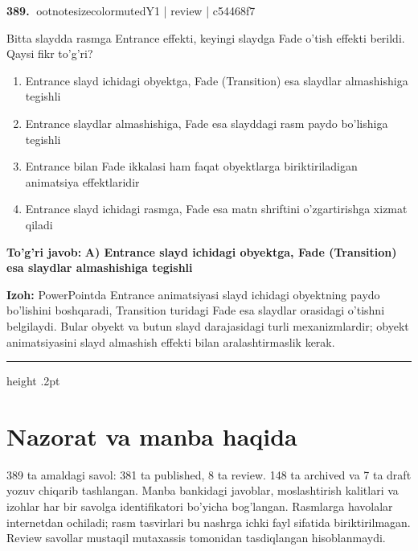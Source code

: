 \documentclass[10pt,a4paper]{article}
\begin{document}
\textbf{\color{ink}389.} {ootnotesizecolor{muted}Y1 | review | c54468f7}
\par
Bitta slaydda rasmga Entrance effekti, keyingi slaydga Fade o'tish effekti berildi. Qaysi fikr to'g'ri?
\begin{enumerate}[label=\Alph*),leftmargin=9mm]
\item Entrance slayd ichidagi obyektga, Fade (Transition) esa slaydlar almashishiga tegishli
\item Entrance slaydlar almashishiga, Fade esa slayddagi rasm paydo bo'lishiga tegishli
\item Entrance bilan Fade ikkalasi ham faqat obyektlarga biriktiriladigan animatsiya effektlaridir
\item Entrance slayd ichidagi rasmga, Fade esa matn shriftini o'zgartirishga xizmat qiladi
\end{enumerate}
\begin{tcolorbox}[enhanced,breakable,colback=teal!4,colframe=teal!55!black,boxrule=0.45pt,arc=1.2mm,left=2.8mm,right=2.8mm,top=2mm,bottom=2mm]
\textbf{\color{teal}To'g'ri javob:} \textbf{A) Entrance slayd ichidagi obyektga, Fade (Transition) esa slaydlar almashishiga tegishli}
\par\smallskip
\textbf{Izoh:} PowerPointda Entrance animatsiyasi slayd ichidagi obyektning paydo bo'lishini boshqaradi, Transition turidagi Fade esa slaydlar orasidagi o'tishni belgilaydi. Bular obyekt va butun slayd darajasidagi turli mexanizmlardir; obyekt animatsiyasini slayd almashish effekti bilan aralashtirmaslik kerak.
\end{tcolorbox}
\vspace{2mm}\hrule height .2pt\vspace{2mm}
\clearpage\section*{Nazorat va manba haqida}
389 ta amaldagi savol: 381 ta published, 8 ta review. 148 ta archived va 7 ta draft yozuv chiqarib tashlangan.
Manba bankidagi javoblar, moslashtirish kalitlari va izohlar har bir savolga identifikatori bo'yicha bog'langan.
Rasmlarga havolalar internetdan ochiladi; rasm tasvirlari bu nashrga ichki fayl sifatida biriktirilmagan.
Review savollar mustaqil mutaxassis tomonidan tasdiqlangan hisoblanmaydi.
\end{document}
